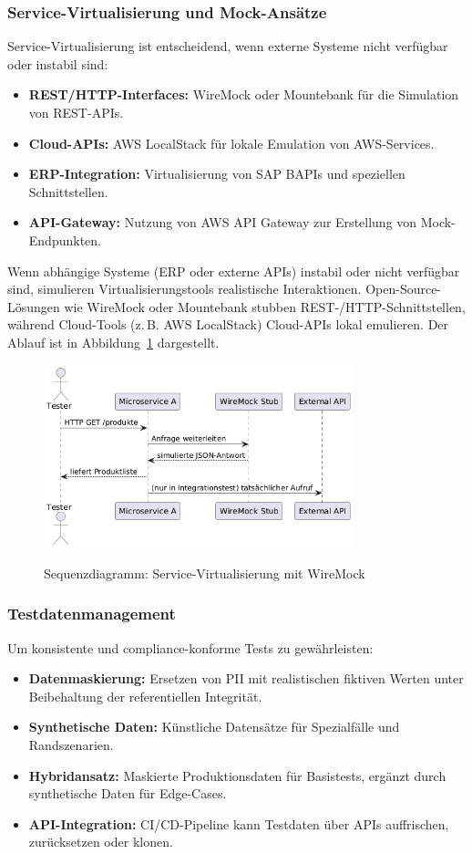 \subsubsection{Service-Virtualisierung und Mock-Ansätze}
Service-Virtualisierung ist entscheidend, wenn externe Systeme nicht verfügbar oder instabil sind:
\begin{itemize}
    \item \textbf{REST/HTTP-Interfaces:} WireMock oder Mountebank für die Simulation von REST-APIs.
    \item \textbf{Cloud-APIs:} AWS LocalStack für lokale Emulation von AWS-Services.
    \item \textbf{ERP-Integration:} Virtualisierung von SAP BAPIs und speziellen Schnittstellen.
    \item \textbf{API-Gateway:} Nutzung von AWS API Gateway zur Erstellung von Mock-Endpunkten.
\end{itemize}
Wenn abhängige Systeme (ERP oder externe APIs) instabil oder nicht verfügbar sind, simulieren Virtualisierungstools realistische Interaktionen. Open-Source-Lösungen wie WireMock oder Mountebank stubben REST-/HTTP-Schnittstellen, während Cloud-Tools (z.\,B. AWS LocalStack) Cloud-APIs lokal emulieren. Der Ablauf ist in Abbildung~\ref{fig:sequence} dargestellt.\begin{figure}[h!]
\centering
\caption{Sequenzdiagramm: Service-Virtualisierung mit WireMock}
    \includegraphics[width=0.8\textwidth]{fig/servicevirti.png}
    \label{fig:sequence}
\end{figure}

\newpage
\subsubsection{Testdatenmanagement}
Um konsistente und compliance-konforme Tests zu gewährleisten:
\begin{itemize}
    \item \textbf{Datenmaskierung:} Ersetzen von PII mit realistischen fiktiven Werten unter Beibehaltung der referentiellen Integrität.
    \item \textbf{Synthetische Daten:} Künstliche Datensätze für Spezialfälle und Randszenarien.
    \item \textbf{Hybridansatz:} Maskierte Produktionsdaten für Basistests, ergänzt durch synthetische Daten für Edge-Cases.
    \item \textbf{API-Integration:} CI/CD-Pipeline kann Testdaten über APIs auffrischen, zurücksetzen oder klonen.
\end{itemize}
